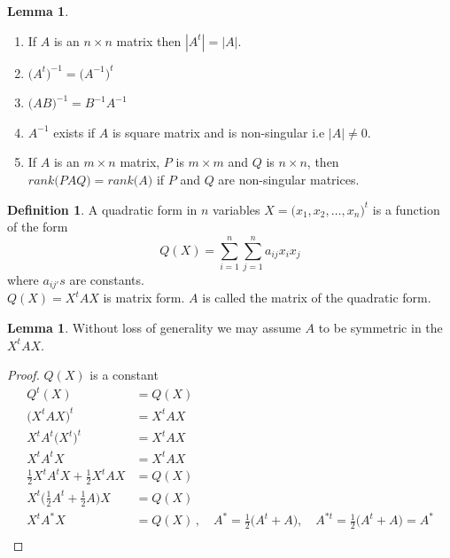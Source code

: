 \documentclass[11pt,a4paper]{article}
\theoremstyle{definition}
\newtheorem{defn}[thm]{Definition}
\newtheorem{lem}[thm]{Lemma}
\begin{document}
\begin{lem}\label{res:lem:1.1.3}
\begin{enumerate}
\item[i.] If $A$ is an $n\times n$ matrix then $|A^t|=|A|$.
\item[ii.] $\big(A^t\big)^{-1}=\big(A^{-1}\big)^t$
\item[iii.] $\big(AB\big)^{-1}=B^{-1}A^{-1}$
\item[iv.] $A^{-1}$ exists if $A$ is square matrix and is non-singular i.e $|A|\neq 0$.
\item[v.] If $A$ is an $m\times n$ matrix, $P$ is $m\times m$ and $Q$ is $n \times n$, then $rank\big(PAQ\big)=rank\big(A\big)$ if $P$ and $Q$ are non-singular matrices.\\
\end{enumerate}
\end{lem}


\begin{defn}\label{res:defn:1.1.4}
A quadratic form in $n$ variables $X=\big(x_1,x_2,\ldots ,x_n\big)^t$ is a function of the form $$Q(X)=\sum^n_{i=1}\sum^n_{j=1}a_{ij}x_ix_j$$ where $a_{ij'}s$ are constants.\\

$Q(X)=X^tAX$ is matrix form. $A$ is called the matrix of the quadratic form.
\end{defn}


\begin{lem}\label{res:lem:1.1.5}
Without loss of generality we may assume $A$ to be symmetric in the $X^tAX$.
\end{lem}

\begin{proof}
$Q(X)$ is a constant
\begin{align*}
Q^t(X) & = Q(X)\\
\big(X^tAX\big)^t & = X^tAX\\
X^tA^t\big(X^t\big)^t & = X^tAX\\
X^tA^tX & = X^tAX\\
\frac{1}{2}X^tA^tX+\frac{1}{2}X^tAX & = Q(X)\\
X^t\Big(\frac{1}{2}A^t+\frac{1}{2}A\Big)X & =Q(X)\\
X^tA^*X & = Q(X)\, , \quad  A^*=\frac{1}{2}\big(A^t+A\big),\quad  A^{*t}=\frac{1}{2}\big(A^{t}+A\big)=A^*\\
\end{align*}
\end{proof}
\end{document}
